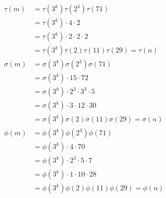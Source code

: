 \documentclass[12pt]{exam}
\theoremstyle{definition}
\begin{document}
\begin{enumerate}
\begin{answer}
              \[
                  \begin{aligned}
                      \tau(m)   & = \tau(3^k)\tau(2^3)\tau(71)                           \\
                                & = \tau(3^k) \cdot 4 \cdot 2                            \\
                                & = \tau(3^k) \cdot 2 \cdot 2 \cdot 2                    \\
                                & = \tau(3^k)\tau(2)\tau(11)\tau(29) = \tau(n)           \\
                      \sigma(m) & = \sigma(3^k)\sigma(2^3)\sigma(71)                     \\
                                & = \sigma(3^k) \cdot 15 \cdot 72                        \\
                                & = \sigma(3^k) \cdot 2^3 \cdot 3^3 \cdot 5              \\
                                & = \sigma(3^k) \cdot 3 \cdot 12 \cdot 30                \\
                                & = \sigma(3^k)\sigma(2)\sigma(11)\sigma(29) = \sigma(n) \\
                      \phi(m)   & = \phi(3^k)\phi(2^3)\phi(71)                           \\
                                & = \phi(3^k) \cdot 4 \cdot 70                           \\
                                & = \phi(3^k) \cdot 2^3 \cdot 5 \cdot 7                  \\
                                & = \phi(3^k) \cdot 1 \cdot 10 \cdot 28                  \\
                                & = \phi(3^k)\phi(2)\phi(11)\phi(29) = \phi(n)           \\
                  \end{aligned}
              \]
          \end{answer}


\end{enumerate}
\end{document}
